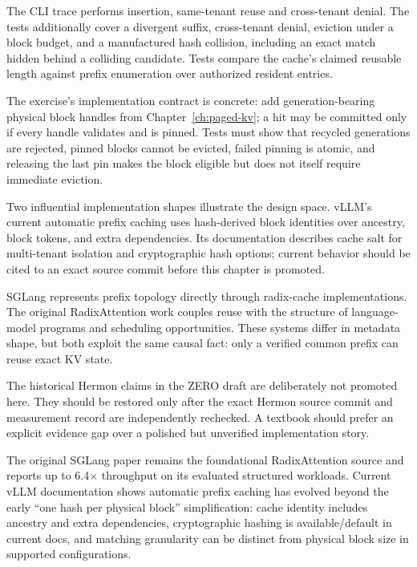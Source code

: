 The CLI trace performs insertion, same-tenant reuse and cross-tenant denial.
The tests additionally cover a divergent
suffix, cross-tenant denial, eviction under a block budget, and a manufactured hash
collision, including an exact match hidden behind a colliding candidate.
Tests compare the cache's claimed reusable length against prefix enumeration
over authorized resident entries.

The exercise's implementation contract is concrete: add generation-bearing physical
block handles from Chapter~\ref{ch:paged-kv}; a hit may be committed only if every
handle validates and is pinned. Tests must show that recycled generations are
rejected, pinned blocks cannot be evicted, failed pinning is atomic, and releasing the
last pin makes the block eligible but does not itself require immediate eviction.


Two influential implementation shapes illustrate the design space. vLLM's current
automatic prefix caching uses hash-derived block identities over ancestry, block
tokens, and extra dependencies. Its documentation describes cache salt for
multi-tenant isolation and cryptographic hash options; current behavior should be
cited to an exact source commit before this chapter is promoted.

SGLang represents prefix topology directly through radix-cache implementations. The
original RadixAttention work couples reuse with the structure of language-model
programs and scheduling opportunities. These systems differ in metadata shape, but
both exploit the same causal fact: only a verified common prefix can reuse exact KV
state.

The historical Hermon claims in the ZERO draft are deliberately not promoted here.
They should be restored only after the exact Hermon source commit and measurement
record are independently rechecked. A textbook should prefer an explicit evidence gap
over a polished but unverified implementation story.


The original SGLang paper remains the foundational RadixAttention source and reports
up to 6.4$\times$ throughput on its evaluated structured workloads. Current vLLM
documentation shows automatic prefix caching has evolved beyond the early
``one hash per physical block'' simplification: cache identity includes ancestry and
extra dependencies, cryptographic hashing is available/default in current docs, and
matching granularity can be distinct from physical block size in supported
configurations.


